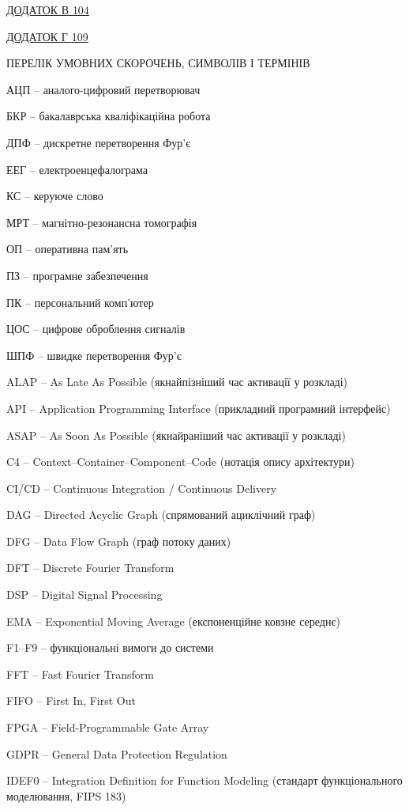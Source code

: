 \documentclass[
]{article}
\begin{document}
\hyperref[_Toc230737413]{ДОДАТОК В \hyperref[_Toc230737413]{104}}

\hyperref[_Toc230737414]{ДОДАТОК Г \hyperref[_Toc230737414]{109}}

ПЕРЕЛІК УМОВНИХ СКОРОЧЕНЬ, СИМВОЛІВ І ТЕРМІНІВ

АЦП -- аналого-цифровий перетворювач

БКР -- бакалаврська кваліфікаційна робота

ДПФ -- дискретне перетворення Фур'є

ЕЕГ -- електроенцефалограма

КС -- керуюче слово

МРТ -- магнітно-резонансна томографія

ОП -- оперативна пам'ять

ПЗ -- програмне забезпечення

ПК -- персональний комп'ютер

ЦОС -- цифрове оброблення сигналів

ШПФ -- швидке перетворення Фур'є

ALAP -- As Late As Possible (якнайпізніший час активації у розкладі)

API -- Application Programming Interface (прикладний програмний
інтерфейс)

ASAP -- As Soon As Possible (якнайраніший час активації у розкладі)

C4 -- Context--Container--Component--Code (нотація опису архітектури)

CI/CD -- Continuous Integration / Continuous Delivery

DAG -- Directed Acyclic Graph (спрямований ациклічний граф)

DFG -- Data Flow Graph (граф потоку даних)

DFT -- Discrete Fourier Transform

DSP -- Digital Signal Processing

EMA -- Exponential Moving Average (експоненційне ковзне середнє)

F1--F9 -- функціональні вимоги до системи

FFT -- Fast Fourier Transform

FIFO -- First In, First Out

FPGA -- Field-Programmable Gate Array

GDPR -- General Data Protection Regulation

IDEF0 -- Integration Definition for Function Modeling (стандарт
функціонального моделювання, FIPS 183)
\end{document}
